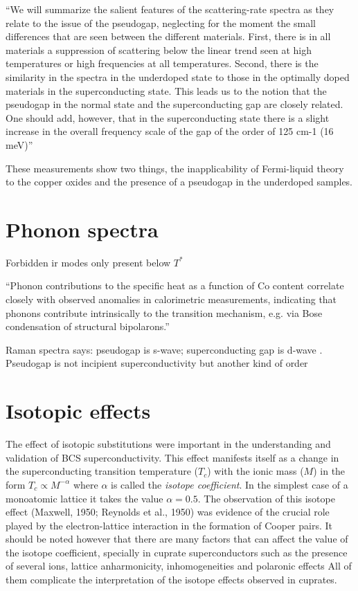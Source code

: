 ``We will summarize the salient features of the scattering-rate spectra as they relate to the issue of the pseudogap, neglecting for the moment the small differences that are seen between the different materials. 
First, there is in all materials a suppression of scattering below the linear trend seen at high temperatures or high frequencies at all temperatures. 
Second, there is the similarity in the spectra in the underdoped state to those in the optimally doped materials in the superconducting state. 
This leads us to the notion that the pseudogap in the normal state and the superconducting gap are closely related. 
One should add, however, that in the superconducting state there is a slight increase in the overall frequency scale of the gap of the order of 125 cm-1 (16 meV)'' \cite{Timusk1999}

These measurements show two things, the inapplicability of Fermi-liquid theory to the copper oxides and the presence of a pseudogap in the underdoped samples.

\section{Phonon spectra}
\label{sec:phonon_spectra}

Forbidden ir modes only present below $T^*$ \cite{?}

``Phonon contributions to the specific heat as a function of Co content correlate closely with observed anomalies in calorimetric measurements, indicating that phonons contribute intrinsically to the transition mechanism, e.g. via Bose condensation of structural bipolarons.'' \cite{Obhi1990} 

Raman spectra says: pseudogap is s-wave; superconducting gap is d-wave \cite{Sakai2013}.
Pseudogap is not incipient superconductivity but another kind of order \cite{He2011}

\section{Isotopic effects}
\label{sec:isotopic_effects}

The effect of isotopic substitutions were important in the understanding and validation of BCS superconductivity.
This effect manifests itself as a change in the superconducting transition temperature ($T_c$) with the ionic mass ($M$) in the form $T_c \propto M^{-\alpha}$ where $\alpha$ is called the \textit{isotope coefficient}.
In the simplest case of a monoatomic lattice it takes the value $\alpha=0.5$.
The observation of this isotope effect \cite{?}(Maxwell, 1950; Reynolds et al.,
1950) was evidence of the crucial role played by the electron-lattice interaction in the formation of Cooper pairs. 
It should be noted however that there are many factors that can affect the value of the isotope coefficient, specially in cuprate superconductors such as the presence of several ions, lattice anharmonicity, inhomogeneities and polaronic effects
All of them complicate the interpretation of the isotope effects observed in cuprates.

